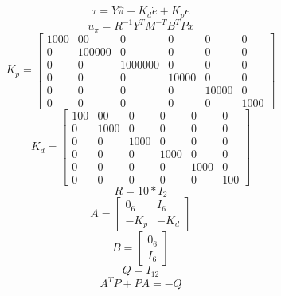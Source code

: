 \documentclass[a4paper]{article}
\begin{document}
\begin{equation}
\tau = Y \hat{\pi} + K_d\dot{e} + K_p e
\end{equation}
\begin{equation}
u_{\pi} = R^{-1} Y^T M^{-T} B^T P x
\end{equation}
\begin{equation}
K_p = 
\begin{bmatrix}
1000 & 00 & 0	& 0 & 0 & 0 \\
0 & 100000 & 0 & 0 & 0 & 0 \\
0 & 0 & 1000000 & 0 & 0 & 0 \\
0 & 0 & 0 & 10000 & 0 & 0 \\
0 & 0 & 0 & 0 & 10000 & 0 \\
0 & 0 & 0 & 0 & 0 & 1000
\end{bmatrix}
\end{equation}
\begin{equation}
K_d = 
\begin{bmatrix}
100 & 00 & 0	& 0 & 0 & 0 \\
0 & 1000 & 0 & 0 & 0 & 0 \\
0 & 0 & 1000 & 0 & 0 & 0 \\
0 & 0 & 0 & 1000& 0 & 0 \\
0 & 0 & 0 & 0 & 1000 & 0 \\
0 & 0 & 0 & 0 & 0 & 100
\end{bmatrix}
\end{equation}
\begin{equation}
R = 10 * I_{2}
\end{equation}
\begin{equation}
A = 
\begin{bmatrix}
0_{6} & I_{6} \\
-K_p & -K_d 
\end{bmatrix}
\end{equation}
\begin{equation}
B = 
\begin{bmatrix}
0_{6} \\
I_{6}
\end{bmatrix}
\end{equation}
\begin{equation}
Q = I_{12}
\end{equation}
\begin{equation}
A^T P + P A = -Q
\end{equation}
\end{document}
